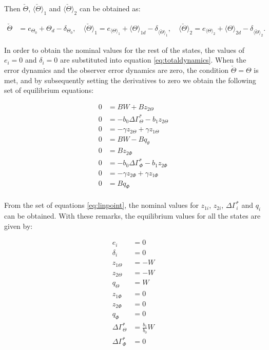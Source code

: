 \documentclass[main.tex]{subfiles}
\begin{document}
	Then $\check{\Theta}$, $\langle \check{\Theta} \rangle_{1}$ and $\langle \check{\Theta} \rangle_{2}$ can be obtained as:
	
	\begin{align}
	\check{\Theta} &= e_{\Theta_0} + \Theta_d - \delta_{\Theta_0}, \quad \langle \check{\Theta} \rangle_{1} = e_{\langle \Theta \rangle_1} + \langle \Theta \rangle_{1d} - \delta_{\langle \check{\Theta} \rangle_{1}}, \quad \langle \check{\Theta} \rangle_{2} = e_{\langle \Theta \rangle_2} + \langle \Theta \rangle_{2d} - \delta_{\langle \check{\Theta} \rangle_{2}}
	\label{eq:esttheta}.
	\end{align}
	
	In order to obtain the nominal values for the rest of the states, the values of $e_i = 0$ and $\delta_i = 0$ are substituted into equation \eqref{eq:totaldynamics}. When the error dynamics and the observer error dynamics are zero, the condition $\check{\Theta} = \Theta$ is met, and by subsequently setting the derivatives to zero we obtain the following set of equilibrium equations:
	
	\begin{align}
	0 &= BW + Bz_{2\Theta} \nonumber\\
	0 &= -b_0 \Delta \Gamma_\Theta^{*} - b_1 z_{2\Theta} \nonumber\\
	0 &= -\gamma z_{2\Theta} + \gamma z_{1\Theta}	\nonumber\\
	0 &= BW - Bq_\theta \nonumber \\
	0 &=  Bz_{2\Phi}\nonumber \\
	0 &= -b_0 \Delta \Gamma_\Phi^{*} - b_1 z_{2\Phi} \nonumber\\
	0 &= -\gamma z_{2\Phi} + \gamma z_{1\Phi}	\nonumber\\
	0 &= Bq_\Phi \nonumber\\
	\label{eq:linpoint}
	\end{align}
	
	From the set of equations \eqref{eq:linpoint}, the nominal values for $z_{1i}$, $z_{2i}$, $\Delta \Gamma_i^*$ and $q_i$ can be obtained. With these remarks, the equilibrium values for all the states are given by:
	
	\begin{align}
		e_i &= 0\nonumber\\
		\delta_i &= 0 \nonumber\\
		z_{1\Theta} &= -W\nonumber\\
		z_{2\Theta} &= -W\nonumber\\
		q_\Theta &= W \nonumber\\
		z_{1\Phi} &= 0\nonumber\\
		z_{2\Phi} &= 0\nonumber\\
		q_\Phi &= 0 \nonumber\\
		\Delta \Gamma_\Theta^* &= \frac{b_1}{b_0}W \nonumber\\
		\Delta \Gamma_\Phi^* &= 0 
	\end{align}
	
\end{document}

